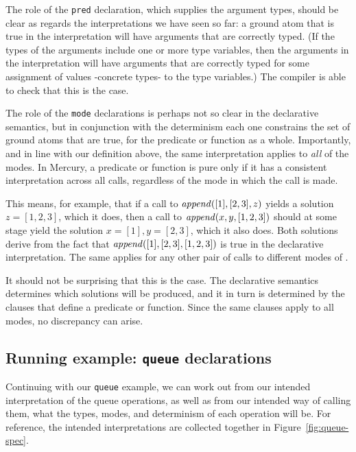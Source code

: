 The role of the \texttt{pred} declaration,
which supplies the argument types,
should be clear as regards the interpretations we have seen so far:
a ground atom that is true in the interpretation
will have arguments that are correctly typed.
(If the types of the arguments include one or more type variables,
then the arguments in the interpretation
will have arguments that are correctly typed
for some assignment of values -concrete types- to the type variables.)
The compiler is able to check that this is the case.

The role of the \texttt{mode} declarations
is perhaps not so clear in the declarative semantics,
but in conjunction with the determinism
each one constrains the set of ground atoms that are true,
for the predicate or function as a whole.
Importantly,
and in line with our definition above,
the same interpretation applies to \emph{all} of the modes.
In Mercury, a predicate or function is pure
only if it has a consistent interpretation across all calls,
regardless of the mode in which the call is made.

This means, for example,
that if a call to $\text{\textit{append}}([1],[2,3],z)$
yields a solution $z = [1,2,3]$,
which it does,
then a call to $\text{\textit{append}}(x,y,[1,2,3])$
should at some stage yield the solution $x = [1], y = [2,3]$,
which it also does.
Both solutions derive from the fact that
$\text{\textit{append}}([1],[2,3],[1,2,3])$ is true
in the declarative interpretation.
The same applies for any other pair of calls
to different modes of .

It should not be surprising that this is the case.
The declarative semantics determines
which solutions will be produced,
and it in turn is determined by
the clauses that define a predicate or function.
Since the same clauses apply to all modes,
no discrepancy can arise.


\subsection{Running example: \texttt{queue} declarations}
\label{sec:queue-decl}

Continuing with our \texttt{queue} example,
we can work out from our intended interpretation of the queue operations,
as well as from our intended way of calling them,
what the types, modes, and determinism of each operation will be.
For reference,
the intended interpretations are collected together
in Figure~\ref{fig:queue-spec}.

